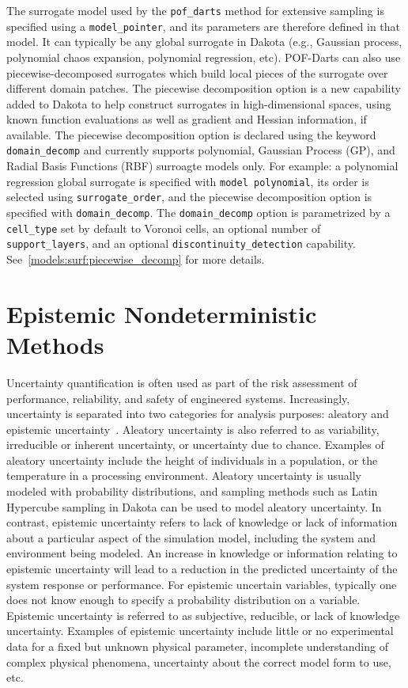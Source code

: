 The surrogate model used by the \texttt{pof\_darts} method for extensive
sampling is specified using a \texttt{model\_pointer}, and its parameters are
therefore defined in that model. It can typically be any global surrogate in
Dakota (e.g., Gaussian process, polynomial chaos expansion, polynomial
regression, etc). POF-Darts can also use piecewise-decomposed surrogates which
build local pieces of the surrogate over different domain patches. The piecewise
decomposition option is a new capability added to Dakota to help construct
surrogates in high-dimensional spaces, using known function evaluations as well
as gradient and Hessian information, if available. The piecewise decomposition
option is declared using the keyword \texttt{domain\_decomp} and currently
supports polynomial, Gaussian Process (GP), and Radial Basis Functions (RBF)
surroagte models only. For example: a polynomial regression global surrogate is
specified with \texttt{model polynomial}, its order is selected using
\texttt{surrogate\_order}, and the piecewise decomposition option is specified
with \texttt{domain\_decomp}. The \texttt{domain\_decomp} option is parametrized
by a \texttt{cell\_type} set by default to Voronoi cells, an optional number of
\texttt{support\_layers}, and an optional \texttt{discontinuity\_detection}
capability. See~\ref{models:surf:piecewise_decomp} for more details.

\section{Epistemic Nondeterministic Methods}\label{uq:epistemic}

Uncertainty quantification is often used as part of the risk
assessment of performance, reliability, and safety of engineered
systems. Increasingly, uncertainty is separated into two categories
for analysis purposes: aleatory and epistemic
uncertainty~\cite{Obe03,Hel07}. Aleatory uncertainty is also referred to as
variability, irreducible or inherent uncertainty, or uncertainty due
to chance. Examples of aleatory uncertainty include the height of
individuals in a population, or the temperature in a processing
environment. Aleatory uncertainty is usually modeled with probability
distributions, and sampling methods such as Latin Hypercube sampling
in Dakota can be used to model aleatory uncertainty. In contrast,
epistemic uncertainty refers to lack of knowledge or lack of
information about a particular aspect of the simulation model,
including the system and environment being modeled. An increase in
knowledge or information relating to epistemic uncertainty will lead
to a reduction in the predicted uncertainty of the system response or
performance. For epistemic uncertain variables, typically one does not
know enough to specify a probability distribution on a variable.
Epistemic uncertainty is referred to as subjective, reducible, or lack
of knowledge uncertainty. Examples of epistemic uncertainty include
little or no experimental data for a fixed but unknown physical
parameter, incomplete understanding of complex physical phenomena,
uncertainty about the correct model form to use, etc.

